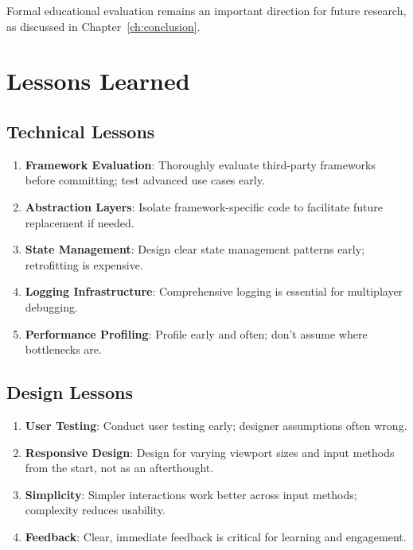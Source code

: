 Formal educational evaluation remains an important direction for future research, as discussed in Chapter~\ref{ch:conclusion}.

\section{Lessons Learned}
\label{sec:lessons-learned}

\subsection{Technical Lessons}
\label{subsec:technical-lessons}

\begin{enumerate}
    \item \textbf{Framework Evaluation}: Thoroughly evaluate third-party frameworks before committing; test advanced use cases early.

    \item \textbf{Abstraction Layers}: Isolate framework-specific code to facilitate future replacement if needed.

    \item \textbf{State Management}: Design clear state management patterns early; retrofitting is expensive.

    \item \textbf{Logging Infrastructure}: Comprehensive logging is essential for multiplayer debugging.

    \item \textbf{Performance Profiling}: Profile early and often; don't assume where bottlenecks are.
\end{enumerate}

\subsection{Design Lessons}
\label{subsec:design-lessons}

\begin{enumerate}
    \item \textbf{User Testing}: Conduct user testing early; designer assumptions often wrong.

    \item \textbf{Responsive Design}: Design for varying viewport sizes and input methods from the start, not as an afterthought.

    \item \textbf{Simplicity}: Simpler interactions work better across input methods; complexity reduces usability.

    \item \textbf{Feedback}: Clear, immediate feedback is critical for learning and engagement.
\end{enumerate}

